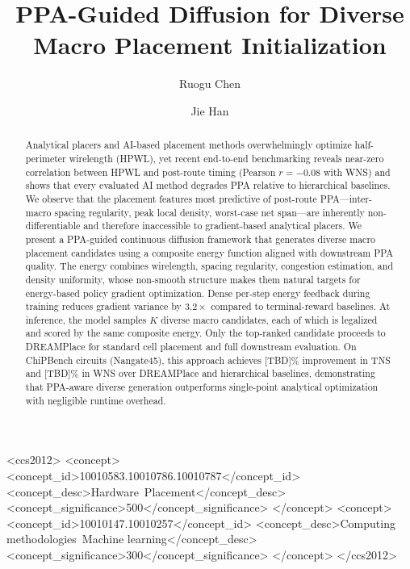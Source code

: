 \documentclass[sigconf,anonymous,review,9pt]{acmart}
\begin{document}
\title{PPA-Guided Diffusion for Diverse Macro Placement Initialization}

\author{Ruogu Chen}

\author{Jie Han}


\begin{abstract}
Analytical placers and AI-based placement methods overwhelmingly
optimize half-perimeter wirelength (HPWL), yet recent end-to-end
benchmarking reveals near-zero correlation between HPWL and post-route
timing (Pearson $r = -0.08$ with WNS) and shows that every evaluated AI
method degrades PPA relative to hierarchical baselines. We observe that
the placement features most predictive of post-route PPA---inter-macro
spacing regularity, peak local density, worst-case net span---are
inherently non-differentiable and therefore inaccessible to gradient-based
analytical placers. We present a PPA-guided continuous diffusion
framework that generates diverse macro placement candidates using a
composite energy function aligned with downstream PPA quality. The energy
combines wirelength, spacing regularity, congestion estimation, and
density uniformity, whose non-smooth structure makes them natural targets
for energy-based policy gradient optimization. Dense per-step energy
feedback during training reduces gradient variance by $3.2\times$
compared to terminal-reward baselines. At inference, the model samples
$K$ diverse macro candidates, each of which is legalized and scored by
the same composite energy. Only the top-ranked candidate proceeds to
DREAMPlace for standard cell placement and full downstream evaluation.
On ChiPBench circuits (Nangate45), this approach achieves [TBD]\%
improvement in TNS and [TBD]\% in WNS over DREAMPlace and hierarchical
baselines, demonstrating that PPA-aware diverse generation outperforms
single-point analytical optimization with negligible runtime overhead.
\end{abstract}

\begin{CCSXML}
<ccs2012>
   <concept>
       <concept_id>10010583.10010786.10010787</concept_id>
       <concept_desc>Hardware~Placement</concept_desc>
       <concept_significance>500</concept_significance>
   </concept>
   <concept>
       <concept_id>10010147.10010257</concept_id>
       <concept_desc>Computing methodologies~Machine learning</concept_desc>
       <concept_significance>300</concept_significance>
   </concept>
</ccs2012>
\end{CCSXML}
\end{document}
